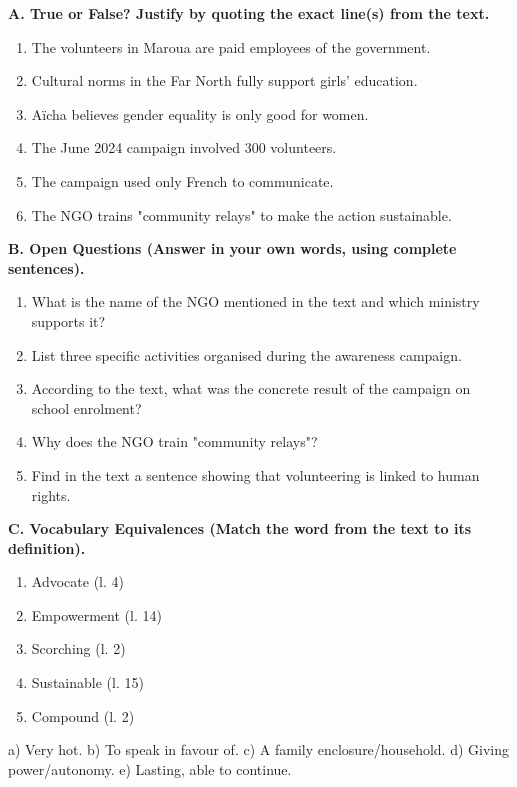 \documentclass[11pt]{article}
\newcommand{\cle}[1]{{\popxbold\color{popdark}#1}}
\begin{document}
\begin{exercice}
\textbf{A. True or False? Justify by quoting the exact line(s) from the text.}
\begin{enumerate}
    \item The volunteers in Maroua are paid employees of the government.
    \item Cultural norms in the Far North fully support girls' education.
    \item Aïcha believes gender equality is only good for women.
    \item The June 2024 campaign involved 300 volunteers.
    \item The campaign used only French to communicate.
    \item The NGO trains "community relays" to make the action sustainable.
\end{enumerate}

\textbf{B. Open Questions (Answer in your own words, using complete sentences).}
\begin{enumerate}
    \item What is the name of the NGO mentioned in the text and which ministry supports it?
    \item List three specific activities organised during the awareness campaign.
    \item According to the text, what was the concrete result of the campaign on school enrolment?
    \item Why does the NGO train "community relays"?
    \item Find in the text a sentence showing that volunteering is linked to human rights.
\end{enumerate}

\textbf{C. Vocabulary Equivalences (Match the word from the text to its definition).}
\begin{enumerate}
    \item \cle{Advocate} (l. 4)
    \item \cle{Empowerment} (l. 14)
    \item \cle{Scorching} (l. 2)
    \item \cle{Sustainable} (l. 15)
    \item \cle{Compound} (l. 2)
    \end{enumerate}
    a) Very hot. \quad b) To speak in favour of. \quad c) A family enclosure/household. \quad d) Giving power/autonomy. \quad e) Lasting, able to continue.
\end{exercice}
\end{document}

